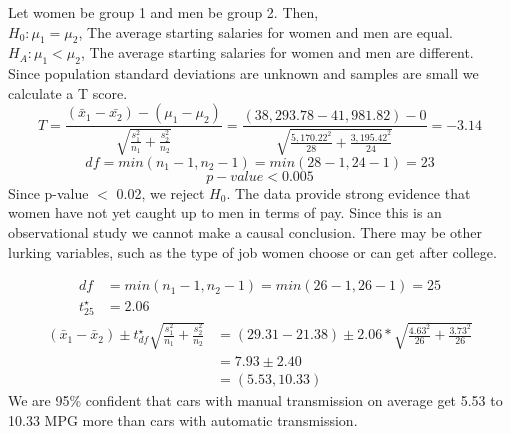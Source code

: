 
{
Let women be group 1 and men be group 2. Then, \\
$H_0: \mu_{1} = \mu_{2}$, The average starting salaries for women and men are equal. \\
$H_A: \mu_{1} < \mu_{2}$, The average starting salaries for women and men are different. \\
Since population standard deviations are unknown and samples are small we calculate a T score.
\[ T = \frac{(\bar{x}_1 - \bar{x_2}) - (\mu_1 - \mu_2)}{\sqrt{ \frac{s_1^2}{n_1} + \frac{s_2^2}{n_2} }} = \frac{(38,293.78 - 41,981.82) - 0}{ \sqrt{\frac{5,170.22 ^2}{28} + \frac{3,195.42 ^2}{24}} } = -3.14 \]
\[ df = min(n_1 - 1, n_2 - 1) = min(28 - 1, 24 - 1) = 23 \]
\[ p-value < 0.005 \]
Since p-value $<$ 0.02, we reject $H_0$. The data provide strong evidence that women have not yet caught up to men in terms of pay. Since this is an observational study we cannot make a causal conclusion. There may be other lurking variables, such as the type of job women choose or can get after college.}
\label{menWomenSalaries}


{
\begin{align*}
df &= min(n_1 - 1, n_2 - 1) = min(26 - 1, 26 - 1) = 25 \\
t^{\star}_{25} &= 2.06
\end{align*}
\begin{align*}
(\bar{x}_1 - \bar{x}_2) \pm t^{\star}_{df} \sqrt{\frac{s_1^2}{n_1} + \frac{s_2^2}{n_2}} &= (29.31 - 21.38) \pm 2.06 * \sqrt{\frac{4.63^2}{26} + \frac{3.73^2}{26}} \\
&= 7.93 \pm 2.40 \\
&= (5.53, 10.33)
\end{align*}
We are 95\% confident that cars with manual transmission on average get 5.53 to 10.33 MPG more than cars with automatic transmission.
}


